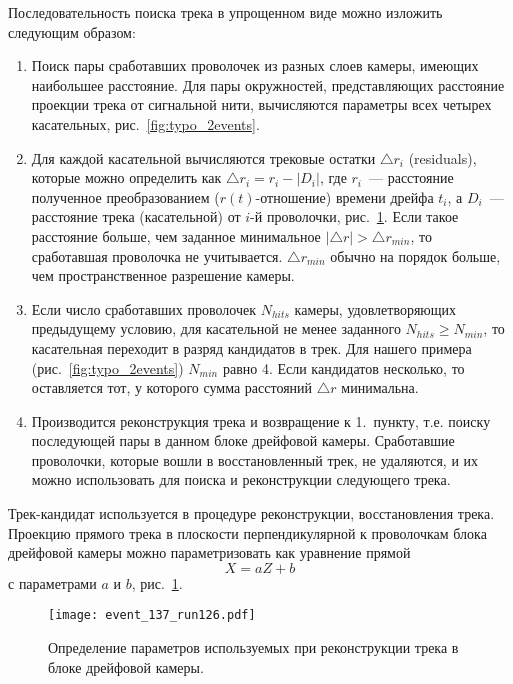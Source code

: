 Последовательность поиска трека в упрощенном виде можно изложить следующим
образом:
\begin{enumerate}
\item Поиск пары сработавших проволочек из разных слоев камеры, имеющих
  наибольшее расстояние. Для пары окружностей, представляющих расстояние
  проекции трека от сигнальной нити, вычисляются параметры всех четырех
  касательных, рис.~\ref{fig:typo_2events}.

\item Для каждой касательной вычисляются трековые остатки $\triangle r_{i}$
  (residuals), которые можно определить как
  $ \triangle r_{i} = r_{i} - |D_{i}|$, где $r_{i}$~--- расстояние полученное
  преобразованием ($r(t)$-отношение) времени дрейфа $t_{i}$, а $D_{i}$~---
  расстояние трека (касательной) от  $i$-й проволочки,
  рис.~\ref{fig:reco_scheme}. Если такое расстояние больше, чем заданное
  минимальное $|\triangle r| > \triangle r_{min}$, то сработавшая проволочка не
  учитывается. $\triangle r_{min}$ обычно на порядок больше, чем
  пространственное разрешение камеры.
\item Если число сработавших проволочек $N_{hits}$ камеры, удовлетворяющих
  предыдущему условию, для касательной не менее заданного
  $N_{hits} \geq  N_{min}$, то касательная переходит в разряд кандидатов в трек.
  Для нашего примера (рис.~\ref{fig:typo_2events}) $N_{min}$ равно 4. Если
  кандидатов несколько, то оставляется тот, у которого сумма расстояний
  $\triangle r$ минимальна.
\item Производится реконструкция трека и возвращение к 1.~пункту, т.е. поиску
  последующей пары в данном блоке дрейфовой камеры. Сработавшие проволочки,
  которые вошли  в восстановленный трек, не удаляются, и их можно использовать
  для поиска и реконструкции следующего трека.
\end{enumerate}

Трек-кандидат используется в процедуре реконструкции, восстановления
трека. Проекцию прямого трека в плоскости перпендикулярной к проволочкам блока
дрейфовой камеры можно параметризовать как уравнение прямой
\begin{equation}
  X = aZ + b
\end{equation}
с параметрами $a$ и $b$, рис.~\ref{fig:reco_scheme}.

\begin{figure}[h]
  \centering
  \texttt{[image: event\_137\_run126.pdf]}
  \caption{Определение параметров используемых при реконструкции трека в
    блоке дрейфовой камеры.}
  \label{fig:reco_scheme}
\end{figure}

